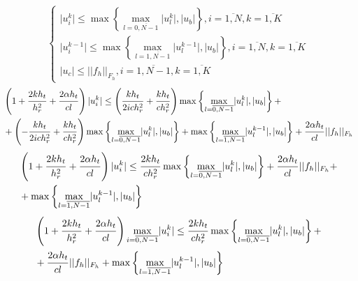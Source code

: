 \documentclass[a4paper,12pt,russian, fleqn]{extreport}
\begin{document}
	\begin{equation}
		\left\{
		\begin{array}{l}
			\vert u_i^k \vert \leq \max\left\{\max\limits_{l = \overline{0, N-1}}\lvert u_l^k \rvert, \lvert u_b \rvert \right\}, i =\overline{1, N}, k = \overline{1, K} \\
			\vert u_i^{k-1} \vert \leq \max\left\{\max\limits_{l = \overline{1, N-1}}\lvert u_l^{k-1} \rvert, \lvert u_b \rvert \right\}, i =\overline{1, N}, k = \overline{1, K} \\
			\lvert u_c \rvert \leq \vert\vert f_h \vert\vert_{F_h}, i = \overline{1, N-1}, k = \overline{1,K}
		\end{array}
		\right.
	\end{equation}
	\begin{align}
		& \left(  1 + \dfrac{\strut 2 k h_t}{\strut h_r^2} + \dfrac{\strut 2 \alpha h_t}{\strut cl} \right)\lvert u^k_i \rvert \leq \left( \dfrac{\strut k h_t}{\strut 2ich_r^2} + \dfrac{\strut k h_t}{\strut c h_r^2} \right)\max\left\{\max\limits_{l = \overline{0, N-1}}\lvert u_l^k \rvert, \lvert u_b \rvert \right\} + \nonumber \\ 
		& + \left(-\dfrac{\strut k h_t}{\strut 2ich_r^2} + \dfrac{\strut k h_t}{\strut c h_r^2}\right) \max\left\{\max\limits_{l = \overline{0, N-1}}\lvert u_l^k \rvert, \lvert u_b \rvert \right\} + \max\left\{\max\limits_{l = \overline{1, N-1}}\lvert u_l^{k-1} \rvert, \lvert u_b \rvert \right\} + \dfrac{\strut 2\alpha h_t}{\strut cl}\lvert \lvert f_h \rvert\rvert_{F_h} 	\nonumber	
	\end{align}
	\begin{align}
		& \left(  1 + \dfrac{\strut 2 k h_t}{\strut h_r^2} + \dfrac{\strut 2 \alpha h_t}{\strut cl} \right)\lvert u^k_i \rvert \leq \dfrac{\strut 2 k h_t}{\strut ch_r^2} \max\left\{\max\limits_{l = \overline{0, N-1}}\lvert u_l^k \rvert, \lvert u_b \rvert \right\} + \dfrac{\strut 2\alpha h_t}{\strut cl}\lvert \lvert f_h \rvert\rvert_{F_h} + \nonumber \\
		& + \max\left\{\max\limits_{l = \overline{1, N-1}}\lvert u_l^{k-1} \rvert, \lvert u_b \rvert \right\} \nonumber
	\end{align}
	\begin{align}
		& \left(  1 + \dfrac{\strut 2 k h_t}{\strut h_r^2} + \dfrac{\strut 2 \alpha h_t}{\strut cl} \right) \max\limits_{i=\overline{0, N-1}} \lvert u^k_i \rvert \leq \dfrac{\strut 2 k h_t}{\strut ch_r^2} \max\left\{\max\limits_{l = \overline{0, N-1}}\lvert u_l^k \rvert, \lvert u_b \rvert \right\} + \nonumber \\ 
		& + \dfrac{\strut 2\alpha h_t}{\strut cl}\lvert \lvert f_h \rvert\rvert_{F_h} + \max\left\{\max\limits_{l = \overline{1, N-1}}\lvert u_l^{k-1} \rvert, \lvert u_b \rvert \right\}
	\end{align}	
	
\end{document}
